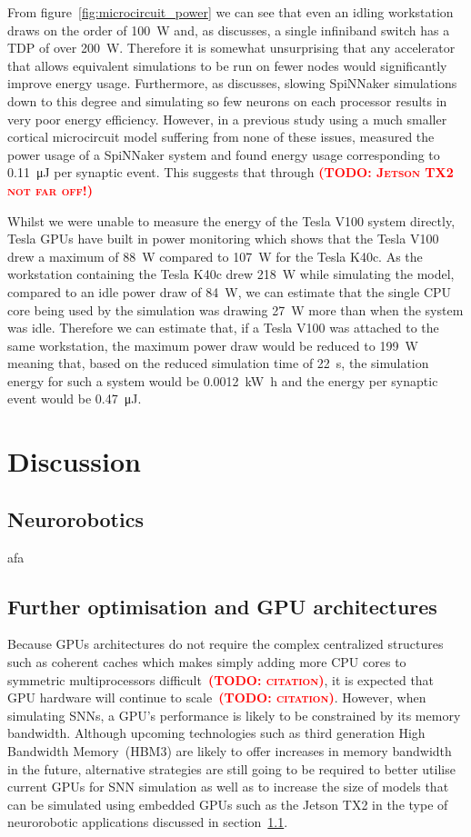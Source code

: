 \documentclass[utf8]{frontiersSCNS} %
\newcommand{\todo}[1]{\textbf{\textsc{\textcolor{red}{(TODO: #1)}}}}
\begin{document}
From figure~\ref{fig:microcircuit_power} we can see that even an idling workstation draws on the order of \SI{100}{\watt} and, as \citeauthor{VanAlbada2018} discusses, a single infiniband switch has a TDP of over \SI{200}{\watt}.
Therefore it is somewhat unsurprising that any accelerator that allows equivalent simulations to be run on fewer nodes would significantly improve energy usage.
Furthermore, as \citeauthor{VanAlbada2018} discusses, slowing SpiNNaker simulations down to this degree and simulating so few neurons on each processor results in very poor energy efficiency.
However, in a previous study using a much smaller cortical microcircuit model suffering from none of these issues, \citet{Sharp2012} measured the power usage of a SpiNNaker system and found energy usage corresponding to \SI{0.11}{\micro\joule} per synaptic event.
This suggests that through \todo{Jetson TX2 not far off!}

Whilst we were unable to measure the energy of the Tesla V100 system directly, Tesla GPUs have built in power monitoring which shows that the Tesla V100 drew a maximum of \SI{88}{\watt} compared to \SI{107}{\watt} for the Tesla K40c.
As the workstation containing the Tesla K40c drew \SI{218}{\watt} while simulating the model, compared to an idle power draw of \SI{84}{\watt}, we can estimate that the single CPU core being used by the simulation was drawing \SI{27}{\watt} more than when the system was idle.
Therefore we can estimate that, if a Tesla V100 was attached to the same workstation, the maximum power draw would be reduced to \SI{199}{\watt} meaning that, based on the reduced simulation time of \SI{22}{\second}, the simulation energy for such a system would be \SI{0.0012}{\kilo\watt\hour} and the energy per synaptic event would be \SI{0.47}{\micro\joule}.

\section{Discussion}
\subsection{Neurorobotics}
\label{sec:discussion/neurobotics}
afa

\subsection{Further optimisation and GPU architectures}
Because GPUs architectures do not require the complex centralized structures such as coherent caches which makes simply adding more CPU cores to symmetric multiprocessors difficult~\todo{citation}, it is expected that GPU hardware will continue to scale~\todo{citation}.
However, when simulating SNNs, a GPU's performance is likely to be constrained by its memory bandwidth.
Although upcoming technologies such as third generation High Bandwidth Memory~(HBM3) are likely to offer increases in memory bandwidth in the future, alternative strategies are still going to be required to better utilise current GPUs for SNN simulation as well as to increase the size of models that can be simulated using embedded GPUs such as the Jetson TX2 in the type of neurorobotic applications discussed in section~\ref{sec:discussion/neurobotics}.
\end{document}
